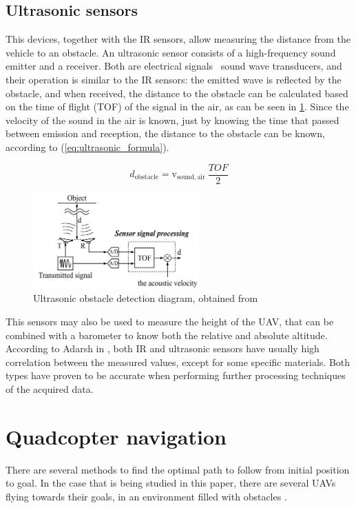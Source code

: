 \documentclass[journal]{IEEEtran}
\newcommand*{\subb}[1]{_{\mathrm{#1}}}
\begin{document}
		\subsection{Ultrasonic sensors}
		This devices, together with the IR sensors, allow measuring the distance from the vehicle to an obstacle. An ultrasonic sensor consists of a high-frequency sound emitter and a receiver. Both are electrical signals \textendash \ sound wave transducers, and their operation is similar to the IR sensors: the emitted wave is reflected by the obstacle, and when received, the distance to the obstacle can be calculated based on the time of flight (TOF) of the signal in the air, as can be seen in \figurename \ref{fig:ultrasonic}. Since the velocity of the sound in the air is known, just by knowing the time that passed between emission and reception, the distance to the obstacle can be known, according to (\ref{eq:ultrasonic_formula}). 
		
		\begin{equation} \label{eq:ultrasonic_formula}
		d\subb{obstacle} = \textrm{v}\subb{sound, air} \ \frac{TOF}{2}
		\end{equation}
		\begin{figure}
			\centering
			\includegraphics[width=2.5in]{ultrasonic2}
			\caption{Ultrasonic obstacle detection diagram, obtained from \cite{hirata2008cross}}
			\label{fig:ultrasonic}
		\end{figure}
		
		This sensors may also be used to measure the height of the UAV, that can be combined with a barometer to know both the relative and absolute altitude. According to Adarsh in \cite{AdarshS2016PcoI}, both IR and ultrasonic sensors have usually high correlation between the measured values, except for some specific materials. Both types have proven to be accurate when performing further processing techniques of the acquired data.
		
	\section{Quadcopter navigation}
	There are several methods to find the optimal path to follow from initial position to goal. In the case that is being studied in this paper, there are several UAVs flying towards their goals, in an environment filled with obstacles \cite{potfieldsmethod}.
	
\end{document}
